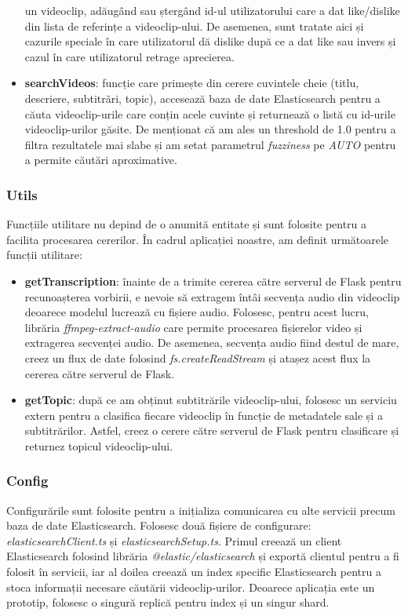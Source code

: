 \begin{itemize}
    un videoclip, adăugând sau ștergând id-ul utilizatorului care a dat like/dislike din lista de
    referințe a videoclip-ului. De asemenea, sunt tratate aici și cazurile speciale în care utilizatorul
    dă dislike după ce a dat like sau invers și cazul în care utilizatorul retrage aprecierea.
    \item \textbf{searchVideos}: funcție care primește din cerere cuvintele cheie (titlu, descriere,
    subtitrări, topic), accesează baza de date Elasticsearch pentru a căuta videoclip-urile care conțin
    acele cuvinte și returnează o listă cu id-urile videoclip-urilor găsite. De menționat că am ales
    un threshold de 1.0 pentru a filtra rezultatele mai slabe și am setat parametrul \textit{fuzziness} 
    pe \textit{AUTO} pentru a permite căutări aproximative.

    
\end{itemize}

\subsubsection{Utils}
Funcțiile utilitare nu depind de o anumită entitate și sunt folosite pentru a facilita procesarea
cererilor. În cadrul aplicației noastre, am definit următoarele funcții utilitare:

\begin{itemize}
    \item \textbf{getTranscription}: înainte de a trimite cererea către serverul de Flask pentru 
    recunoașterea vorbirii, e nevoie să extragem întâi secvența audio din videoclip deoarece 
    modelul lucrează cu fișiere audio. Folosesc, pentru acest lucru, librăria \textit{ffmpeg-extract-audio}
    care permite procesarea fișierelor video și extragerea secvenței audio. De asemenea, secvența
    audio fiind destul de mare, creez un flux de date folosind \textit{fs.createReadStream} și 
    atașez acest flux la cererea către serverul de Flask.
    \item \textbf{getTopic}: după ce am obținut subtitrările videoclip-ului, folosesc un serviciu
    extern pentru a clasifica fiecare videoclip în funcție de metadatele sale și a subtitrărilor.
    Astfel, creez o cerere către serverul de Flask pentru clasificare și returnez topicul videoclip-ului.
\end{itemize}

\subsubsection{Config}
Configurările sunt folosite pentru a inițializa comunicarea cu alte servicii precum baza de date
Elasticsearch. Folosesc două fișiere de configurare: \textit{elasticsearchClient.ts} și
\textit{elasticsearchSetup.ts}. Primul creează un client Elasticsearch folosind librăria
\textit{@elastic/elasticsearch} și exportă clientul pentru a fi folosit în servicii, iar al doilea
creează un index specific Elasticsearch pentru a stoca informații necesare căutării videoclip-urilor.
Deoarece aplicația este un prototip, folosesc o singură replică pentru index și un singur shard.

